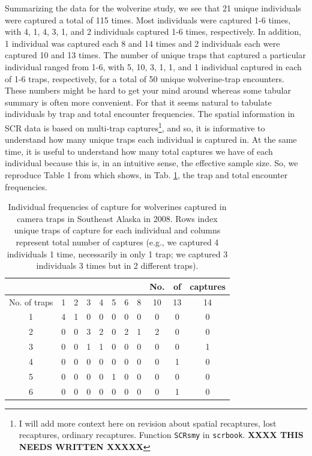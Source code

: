 Summarizing the data for the wolverine study, we see that 21
unique individuals were captured a total of 115 times. Most
individuals were captured 1-6 times, with 4, 1, 4, 3, 1, and 2
individuals captured 1-6 times, respectively.  In addition, 1
individual was captured each 8 and 14 times and 2 individuals each
were captured 10 and 13 times.  The number of unique traps that
captured a particular individual ranged from 1-6, with 5, 10, 3, 1, 1,
and 1 individual captured in each of 1-6 traps, respectively, for a
total of 50 unique wolverine-trap encounters.  These numbers might be
hard to get your mind around whereas some tabular summary is often
more convenient. For that it seems natural to tabulate individuals by
trap and total encounter frequencies. The spatial information in SCR
data is based on multi-trap captures\footnote{I will add more context
  here on revision about spatial recaptures, lost recaptures, ordinary
  recaptures. Function \mbox{\tt SCRsmy} in \mbox{\tt scrbook}. {\bf
    XXXX THIS NEEDS WRITTEN XXXXX}  }, and
so, it is informative to understand how many unique traps each
individual is captured in. At the same time, it is useful to
understand how many total captures we have of each individual because
this is, in an intuitive sense, the effective sample size.  So, we
reproduce Table 1 from \citet{royle_etal:2011jwm} which shows,
in Tab. \ref{scr0.tab.wolverine}, the trap
and total encounter frequencies.



\begin{table} [htp]
  \caption{Individual frequencies of capture for wolverines captured
    in camera traps in Southeast Alaska in 2008. Rows index unique
    traps of capture for each individual
and columns represent total number of captures
    (e.g., we captured 4 individuals 1 time, necessarily in only 1
    trap; we captured 3 individuals 3 times but in 2 different traps).
}
\centering
\begin{tabular}{c c c c c c c c c c c}
\hline
 & & & & & & & &  No.&of&captures \\
\hline
No. of traps & 1 & 2 & 3 & 4 & 5 & 6 & 8 & 10 &13 &14 \\
\hline
1 & 4 & 1 & 0 & 0 & 0 & 0 & 0 & 0 & 0 & 0 \\
2 & 0 & 0 & 3 & 2 & 0 & 2 & 1 & 2 & 0 & 0 \\
3 & 0 & 0 & 1 & 1 & 0 & 0 & 0 & 0 & 0 & 1 \\
4 & 0 & 0 & 0 & 0 & 0 & 0 & 0 & 0 & 1 & 0 \\
5 & 0 & 0 & 0 & 0 & 1 & 0 & 0 & 0 & 0 & 0 \\
6 & 0 & 0 & 0 & 0 & 0 & 0 & 0 & 0 & 1 & 0 \\
\hline
\end{tabular}
\label{scr0.tab.wolverine}
\end{table}


